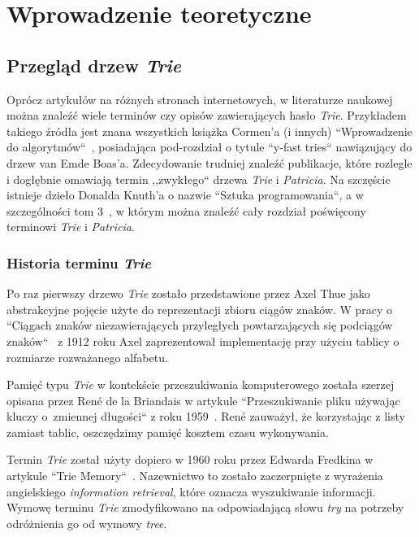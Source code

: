 \chapter{Wprowadzenie teoretyczne}\label{cha:czescTeoretyczna}

	\section{Przegląd drzew \emph{Trie}}\label{sec:czescTeoretycznaPrzegladDrzewTrie}
	
		Oprócz artykułów na różnych stronach internetowych, w literaturze naukowej można znaleźć wiele terminów czy opisów zawierających hasło \emph{Trie}. Przykładem takiego źródła jest znana wszystkich książka Cormen'a (i innych) ``Wprowadzenie do algorytmów``~\cite{CormensIntroductionToAlgorithms}, posiadająca pod-rozdział o tytule ``y-fast tries`` nawiązujący do drzew van Emde Boas'a. Zdecydowanie trudniej znaleźć publikacje, które rozlegle i dogłębnie omawiają termin ,,zwykłego`` drzewa \emph{Trie} i \emph{Patricia}. Na szczęście istnieje dzieło Donalda Knuth'a o nazwie ``Sztuka programowania``, a w szczególności tom 3~\cite{KnuthsTheArtOfComputerProgramming3}, w którym można znaleźć cały rozdział poświęcony terminowi \emph{Trie} i \emph{Patricia}.
	
		\subsection{Historia terminu \emph{Trie}}\label{sec:czescTeoretycznaPrzegladDrzewTrieHistoriaTerminuTrie}
    	Po raz pierwszy drzewo \emph{Trie} zostało przedstawione przez Axel Thue jako abstrakcyjne pojęcie użyte do reprezentacji zbioru ciągów znaków. W pracy o ``Ciągach znaków niezawierających przyległych powtarzających się podciągów znaków``~\cite{ThuesSelectedMathematicalPapers} z 1912 roku Axel zaprezentował implementację przy użyciu tablicy o rozmiarze rozważanego alfabetu.
		
		Pamięć typu \emph{Trie} w kontekście przeszukiwania komputerowego została szerzej opisana przez René de la Briandais w artykule ``Przeszukiwanie pliku używając kluczy o~zmiennej długości`` z roku 1959~\cite{BriandaisWesternJointComputerConf,MediumComTryingToUnderstandTries}. René zauważył, że korzystając z listy zamiast tablic, oszczędzimy pamięć kosztem czasu wykonywania.
				
		Termin \emph{Trie} został użyty dopiero w 1960 roku przez Edwarda Fredkina w artykule ``Trie Memory``~\cite{FredkinsTrieMemory}. Nazewnictwo to zostało zaczerpnięte z wyrażenia angielskiego \emph{information retrieval}, które oznacza wyszukiwanie informacji. Wymowę terminu \emph{Trie} zmodyfikowano na odpowiadającą słowu \emph{try} na potrzeby odróżnienia go od wymowy \emph{tree}.
	
